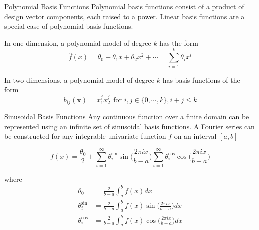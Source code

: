 \documentclass{beamer}
\begin{document}
\begin{frame}{Polynomial Basis Functions}
Polynomial basis functions consist of a product of design vector components, each raised to a power. Linear basis functions are a special case of polynomial basis functions.

In one dimension, a polynomial model of degree $k$ has the form
\begin{equation*}
    \hat{f}(x) = \theta_0 + \theta_1 x + \theta_2 x^2 + \cdots = \sum_{i=1}^k \theta_i x^i
\end{equation*}

In two dimensions, a polynomial model of degree $k$ has basis functions of the form
\begin{equation*}
    b_{ij}(\boldsymbol{x}) = x_1^j x_2^j ~~{\textrm{for~}} i, j \in \{0, \cdots, k\}, i+j \leq k
\end{equation*}
\end{frame}

\begin{frame}{Sinusoidal Basis Functions}
Any continuous function over a finite domain can be represented using an infinite set of sinusoidal basis functions. A Fourier series can be constructed for any integrable univariate function $f$ on an interval $[a, b]$

\begin{equation*}
    f(x) = \frac{\theta_0}{2} + \sum_{i=1}^\infty \theta_i^{\sin} \sin \bigg(\frac{2\pi ix}{b-a}\bigg)
    \sum_{i=1}^\infty \theta_i^{\cos} \cos \bigg(\frac{2\pi ix}{b-a}\bigg)
\end{equation*}

where
\begin{equation*}
    \begin{split}
        \theta_0 &= \frac{2}{b-a} \int_a^b f(x)dx \\ 
        \theta_i^{\sin}&= \frac{2}{b-a} \int_a^b f(x)\sin \bigg(\frac{2\pi ix}{b-a}\bigg) dx \\ 
        \theta_i^{\cos}&= \frac{2}{b-a} \int_a^b f(x)\cos \bigg(\frac{2\pi ix}{b-a}\bigg) dx 
    \end{split}
\end{equation*}

\end{frame}
\end{document}
